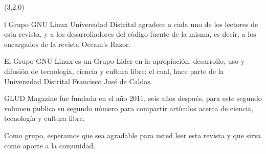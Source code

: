 \begin{textblock}{20}(3,2.0)

\begin{minipage}{.45\linewidth}
\colorbox{introcolor}{
\begin{minipage}{1\linewidth}

{{}{l Grupo GNU Linux Universidad Distrital agradece a cada uno de los lectores de esta revista, y a los desarrolladores del c\'odigo fuente de la misma, es decir, a los encargados de la revista Occam's Razor. 


\bigskip

}
}

\end{minipage}
}

\vspace{8mm}

El Grupo GNU Linux es un Grupo Lider en la apropiación, desarrollo, uso y difusión de tecnología, ciencia y cultura libre; el cual, hace parte de la Universidad Distrital Francisco José de Caldas.

\vspace{3mm}
GLUD Magazine fue fundada en el año 2011, seis años después, para este segundo volumen publica su segundo número para compartir artículos acerca de ciencia, tecnología  y cultura libre.

\bigskip

Como grupo, esperamos que sea agradable para usted leer esta revista y que sirva como aporte a la comunidad.

\medskip

\begin{flushright}
{\Large{}}
\end{flushright}

\vspace{5cm}

\bigskip


\end{minipage}

\bigskip

\colorbox{introcolor}{
\begin{minipage}{.45\linewidth}

\bigskip

{\footnotesize{}}
\end{minipage}}
\end{textblock}
